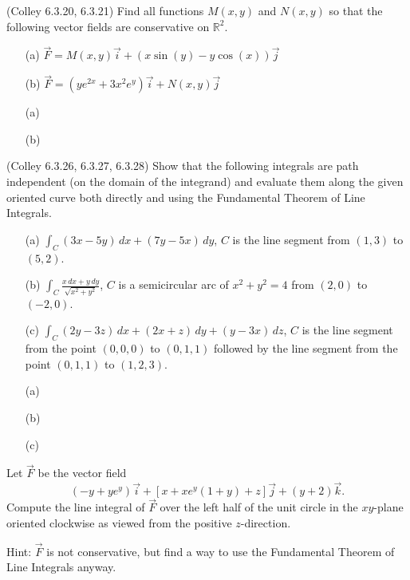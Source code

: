 \documentclass[11pt,letterpaper,cm]{nupset}
\begin{document}
\begin{problem}[Exercise 2] (Colley 6.3.20, 6.3.21) Find all functions $M(x,y)$ and $N(x,y)$ so that the following vector fields are conservative on $\mathbb{R}^2$.
	\begin{itemize}
		\item[(a)] $\vec{F}=M(x,y)\vec{i}+(x\sin(y)-y\cos(x))\vec{j}$
		\item[(b)] $\vec{F}=(ye^{2x}+3x^2 e^y)\vec{i}+N(x,y)\vec{j}$
	\end{itemize}
\end{problem}
\begin{solution}
		\begin{itemize}
		\item[(a)] 
		\item[(b)] 
	\end{itemize}
\end{solution}
\newpage

\begin{problem}[Exercise 3] (Colley 6.3.26, 6.3.27, 6.3.28) Show that the following integrals are path independent (on the domain of the integrand) and evaluate them along the given oriented curve both directly and using the Fundamental Theorem of Line Integrals.
	\begin{itemize}
		\item[(a)] $\displaystyle\int_C (3x-5y)\,dx+(7y-5x)\,dy$, $C$ is the line segment from $(1,3)$ to $(5,2)$.
		\item[(b)] $\displaystyle\int_C \frac{x\,dx+y\,dy}{\sqrt{x^2+y^2}}$, $C$ is a semicircular arc of $x^2+y^2=4$ from $(2,0)$ to $(-2,0)$.
		\item[(c)] $\displaystyle\int_C (2y-3z)\,dx+(2x+z)\,dy+(y-3x)\,dz$, $C$ is the line segment from the point $(0,0,0)$ to $(0,1,1)$ followed by the line segment from the point $(0,1,1)$ to $(1,2,3)$.
	\end{itemize}
\end{problem}
\begin{solution}
	\begin{itemize}
		\item[(a)] 
		\item[(b)] 
		\item[(c)] 
	\end{itemize}
\end{solution}
\newpage

\begin{problem}[Exercise 4] Let $\vec{F}$ be the vector field
	$$(-y+ye^y)\vec{i}  + [x+xe^y(1+y)+z]\vec{j} + (y+2)\vec{k}.$$
	Compute the line integral of $\vec{F}$ over the left half of the unit circle in the $xy$-plane oriented clockwise as viewed from the positive $z$-direction. 
	
	Hint: $\vec{F}$ is not conservative, but find a way to use the Fundamental Theorem of Line Integrals anyway.
\end{problem}
\begin{solution}
\end{solution}
\newpage
\end{document}
